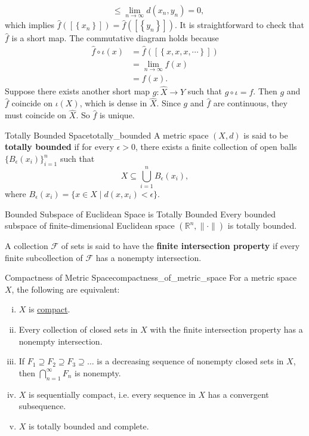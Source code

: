 \documentclass{report}
\begin{document}
\begin{prf}
\begin{itemize}
\begin{align*}
			                                                                                                        & \le \lim_{n\to\infty}d(x_n,y_n)=0,
		      \end{align*}
		      which implies $\hat{f}\left([\left\{x_n\right\}]\right)=\hat{f}\left([\left\{y_n\right\}]\right)$. It is straightforward to check that $\hat{f}$ is a short map. The commutative diagram holds because
		      \begin{align*}
			      \hat{f}\circ\iota(x) & =\hat{f}\left([\left\{x,x,x,\cdots\right\}]\right) \\
			                           & =\lim_{n\to\infty}f(x)                             \\
			                           & =f(x).
		      \end{align*}
		      Suppose there exists another short map $g:\widehat{X}\to Y$ such that $g\circ\iota=f$. Then $g$ and $\hat{f}$ coincide on $\iota(X)$, which is dense in $\widehat{X}$. Since $g$ and $\hat{f}$ are continuous, they must coincide on $\widehat{X}$. So $\hat{f}$ is unique.
	\end{itemize}
\end{prf}

\begin{definition}{Totally Bounded Space}{totally_bounded}
	A metric space $(X,d)$ is said to be \textbf{totally bounded} if for every $\epsilon>0$, there exists a finite collection of open balls $\{B_\epsilon(x_i)\}_{i=1}^n$ such that
	\[
		X\subseteq\bigcup_{i=1}^n B_\epsilon(x_i),
	\]
	where $B_\epsilon(x_i)=\{x\in X\mid d(x,x_i)<\epsilon\}$.
\end{definition}

\begin{proposition}{Bounded Subspace of Euclidean Space is Totally Bounded}{}
	Every bounded subspace of finite-dimensional Euclidean space $\left(\mathbb{R}^n,\|\cdot\|\right)$ is totally bounded.
\end{proposition}

A collection $\mathcal{F}$ of sets is said to have the \textbf{finite intersection property} if every finite subcollection of $\mathcal{F}$ has a nonempty intersection.
\begin{proposition}{Compactness of Metric Space}{compactness_of_metric_space}
	For a metric space $X$, the following are equivalent:
	\begin{enumerate}[(i)]
		\item $X$ is \hyperref[th:compact_topological_space]{compact}.
		\item Every collection of closed sets in $X$ with the finite intersection property has a nonempty intersection.
		\item If $F_1 \supseteq F_2 \supseteq F_3 \supseteq \ldots$ is a decreasing sequence of nonempty closed sets in $X$, then $\bigcap_{n=1}^{\infty} F_n$ is nonempty.
		\item $X$ is sequentially compact, i.e. every sequence in $X$ has a convergent subsequence.
		\item $X$ is totally bounded and complete.
	\end{enumerate}
\end{proposition}
\end{document}
